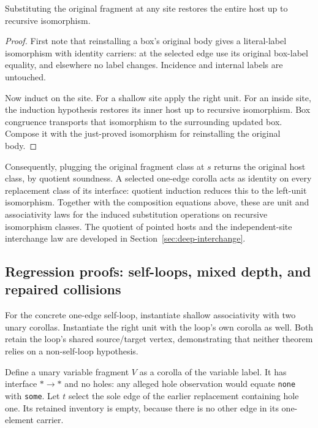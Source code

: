 \begin{lemma}
Substituting the original fragment at any site restores the entire host up to
recursive isomorphism.
\end{lemma}
\begin{proof}
First note that reinstalling a box's original body gives a literal-label
isomorphism with identity carriers: at the selected edge use its original
box-label equality, and elsewhere no label changes. Incidence and internal
labels are untouched.

Now induct on the site. For a shallow site apply the right unit. For an inside
site, the induction hypothesis restores its inner host up to recursive
isomorphism. Box congruence transports that isomorphism to the surrounding
updated box. Compose it with the just-proved isomorphism for reinstalling the
original body.
\end{proof}

Consequently, plugging the original fragment class at $s$ returns the original
host class, by quotient soundness. A selected one-edge corolla acts as identity
on every replacement class of its interface: quotient induction reduces this
to the left-unit isomorphism. Together with the composition equations above,
these are unit and associativity laws for the induced substitution operations
on recursive isomorphism classes. The quotient of pointed hosts and the
independent-site interchange law are developed in Section~\ref{sec:deep-interchange}.

\subsection{Regression proofs: self-loops, mixed depth, and repaired collisions}

For the concrete one-edge self-loop, instantiate shallow associativity with
two unary corollas. Instantiate the right unit with the loop's own corolla as
well. Both retain the loop's shared source/target vertex, demonstrating that
neither theorem relies on a non-self-loop hypothesis.

Define a unary variable fragment $V$ as a corolla of the variable label. It has
interface $*\to *$ and no holes: any alleged hole observation would equate
\texttt{none} with \texttt{some}. Let $t$ select the sole edge of the earlier
replacement containing hole one. Its retained inventory is empty, because
there is no other edge in its one-element carrier.

